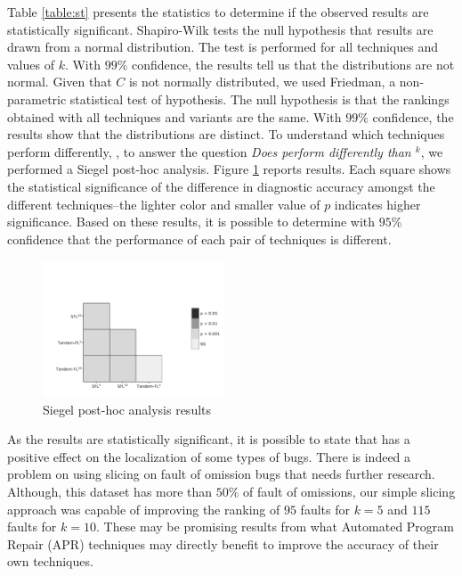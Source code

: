 \documentclass{article}
\begin{document}
Table \ref{table:st} presents the statistics to determine if the
observed results are statistically significant. Shapiro-Wilk tests the
null hypothesis that results are drawn from a normal distribution. The
test is performed for all techniques and values of $k$. With $99\%$
confidence, the results tell us that the distributions are not
normal. Given that $C$ is not normally distributed, we used Friedman, a
non-parametric statistical test of hypothesis. The null hypothesis is
that the rankings obtained with all techniques and variants are the
same. With $99\%$ confidence, the results show that the distributions
are distinct. To understand which techniques perform differently,
\ie{}, to answer the question \textit{Does  perform
  differently than \sfl{}$^{k}$}, we performed a Siegel post-hoc
analysis. Figure \ref{fig:performance} reports results. Each square
shows the statistical significance of the difference in diagnostic
accuracy amongst the different techniques--the lighter color and
smaller value of $p$ indicates higher significance. Based on these
results, it is possible to determine with $95\%$ confidence that the
performance of each pair of techniques is different.

\begin{figure}[h]
	\vspace{-1cm}
		\includegraphics[width=0.48\textwidth]{figures/heatmap_nemenyi_result.pdf}
		\caption{Siegel post-hoc analysis results}
		\label{fig:performance}
		\vspace{-0.3cm}
\end{figure}

As the results are statistically significant, it is possible to state
that  has a positive effect on the localization of some
types of bugs. There is indeed a problem on using slicing on fault of
omission bugs that needs further research.  Although, this dataset has
more than $50\%$ of fault of omissions, our simple slicing approach
was capable of improving the ranking of $95$ faults for $k=5$ and
$115$ faults for $k=10$. These may be promising results from what Automated
Program Repair (APR) techniques may directly benefit to improve the accuracy
of their own techniques.
\end{document}

